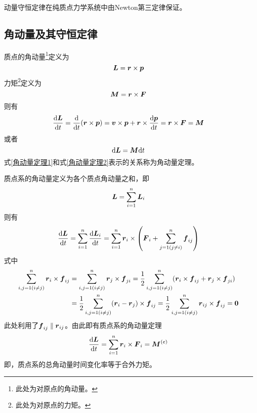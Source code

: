 动量守恒定律在纯质点力学系统中由Newton第三定律保证。

\subsection{角动量及其守恒定律}

质点的{\heiti 角动量}\footnote{此处为对原点的角动量。}定义为
\begin{equation}
	\boldsymbol{L} = \boldsymbol{r} \times \boldsymbol{p}
\end{equation}
{\heiti 力矩}\footnote{此处为对原点的力矩。}定义为
\begin{equation}
	\boldsymbol{M} = \boldsymbol{r} \times \boldsymbol{F}
\end{equation}
则有
\begin{equation}
	\frac{\mathrm{d} \boldsymbol{L}}{\mathrm{d} t} = \frac{\mathrm{d}}{\mathrm{d} t}(\boldsymbol{r} \times \boldsymbol{p}) = \boldsymbol{v} \times \boldsymbol{p} + \boldsymbol{r} \times \frac{\mathrm{d} \boldsymbol{p}}{\mathrm{d} t} = \boldsymbol{r} \times \boldsymbol{F} = \boldsymbol{M}
	\label{角动量定理1}
\end{equation}
或者
\begin{equation}
	\mathrm{d} \boldsymbol{L} = \boldsymbol{M} \mathrm{d} t
	\label{角动量定理2}
\end{equation}
式\eqref{角动量定理1}和式\eqref{角动量定理2}表示的关系称为{\heiti 角动量定理}。

质点系的角动量定义为各个质点角动量之和，即
\begin{equation}
	\boldsymbol{L} = \sum_{i=1}^n \boldsymbol{L}_i
\end{equation}
则有
\begin{equation*}
	\frac{\mathrm{d} \boldsymbol{L}}{\mathrm{d} t} = \sum_{i=1}^n \frac{\mathrm{d} \boldsymbol{L}_i}{\mathrm{d} t} = \sum_{i=1}^n \boldsymbol{r}_i \times \left(\boldsymbol{F}_i + \sum_{j=1(j\neq i)}^n \boldsymbol{f}_{ij}\right)
\end{equation*}
式中
\begin{align*}
	\sum_{i,j=1(i \neq j)}^n \boldsymbol{r}_i \times \boldsymbol{f}_{ij} & = \sum_{i,j=1(i\neq j)}^n \boldsymbol{r}_j \times \boldsymbol{f}_{ji} = \frac12 \sum_{i,j=1(i\neq j)}^n (\boldsymbol{r}_i \times \boldsymbol{f}_{ij} + \boldsymbol{r}_j \times \boldsymbol{f}_{ji}) \\
	& = \frac12 \sum_{i,j=1(i \neq j)}^n (\boldsymbol{r}_i -\boldsymbol{r}_j) \times \boldsymbol{f}_{ij} = \frac12 \sum_{i,j=1(i \neq j)}^n \boldsymbol{r}_{ij} \times \boldsymbol{f}_{ij} = \boldsymbol{0}
\end{align*}
此处利用了$\boldsymbol{f}_{ij} \parallel \boldsymbol{r}_{ij}$。由此即有{\heiti 质点系的角动量定理}
\begin{equation}
	\frac{\mathrm{d} \boldsymbol{L}}{\mathrm{d} t} = \sum_{i=1}^n \boldsymbol{r}_i \times \boldsymbol{F}_i = \boldsymbol{M}^{(e)}
\end{equation}
即，质点系的总角动量时间变化率等于合外力矩。

